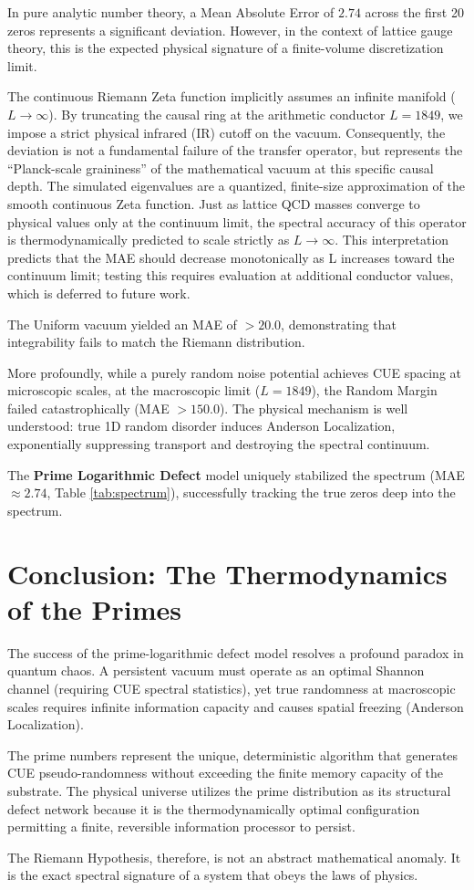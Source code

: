 \documentclass[11pt,aps,prd,twocolumn,nofootinbib,superscriptaddress]{revtex4-2}
\begin{document}
In pure analytic number theory, a Mean Absolute Error of $2.74$ across the first 20 zeros represents a significant deviation. However, in the context of lattice gauge theory, this is the expected physical signature of a finite-volume discretization limit. 

The continuous Riemann Zeta function implicitly assumes an infinite manifold ($L \to \infty$). By truncating the causal ring at the arithmetic conductor $L = 1849$, we impose a strict physical infrared (IR) cutoff on the vacuum. Consequently, the deviation is not a fundamental failure of the transfer operator, but represents the ``Planck-scale graininess'' of the mathematical vacuum at this specific causal depth. The simulated eigenvalues are a quantized, finite-size approximation of the smooth continuous Zeta function. Just as lattice QCD masses converge to physical values only at the continuum limit, the spectral accuracy of this operator is thermodynamically predicted to scale strictly as $L \to \infty$. This interpretation predicts that the MAE should decrease monotonically as L increases toward the continuum limit; testing this requires evaluation at additional conductor values, which is deferred to future work.

The Uniform vacuum yielded an MAE of $>20.0$, demonstrating that integrability fails to match the Riemann distribution. 

More profoundly, while a purely random noise potential achieves CUE spacing at microscopic scales, at the macroscopic limit ($L=1849$), the Random Margin failed catastrophically (MAE $> 150.0$). The physical mechanism is well understood: true 1D random disorder induces Anderson Localization, exponentially suppressing transport and destroying the spectral continuum. 

The \textbf{Prime Logarithmic Defect} model uniquely stabilized the spectrum (MAE $\approx 2.74$, Table \ref{tab:spectrum}), successfully tracking the true zeros deep into the spectrum.

\section{Conclusion: The Thermodynamics of the Primes}

The success of the prime-logarithmic defect model resolves a profound paradox in quantum chaos. A persistent vacuum must operate as an optimal Shannon channel (requiring CUE spectral statistics), yet true randomness at macroscopic scales requires infinite information capacity and causes spatial freezing (Anderson Localization).

The prime numbers represent the unique, deterministic algorithm that generates CUE pseudo-randomness without exceeding the finite memory capacity of the substrate. The physical universe utilizes the prime distribution as its structural defect network because it is the thermodynamically optimal configuration permitting a finite, reversible information processor to persist. 

The Riemann Hypothesis, therefore, is not an abstract mathematical anomaly. It is the exact spectral signature of a system that obeys the laws of physics.


\end{document}

